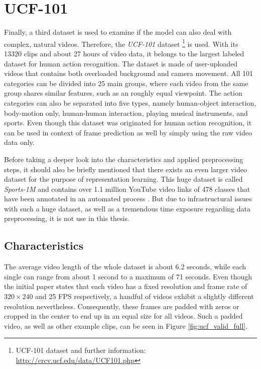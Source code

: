 \section{UCF-101} \label{sec:ds_ucf}

Finally, a third dataset is used to examine if the model can also deal with complex, natural videos. Therefore, the \textit{UCF-101} dataset \parencite{ucf}\footnote{UCF-101 dataset and further information: \url{http://crcv.ucf.edu/data/UCF101.php}} is used. With its \num{13320} clips and about \num{27} hours of video data, it belongs to the largest labeled dataset for human action recognition. The dataset is made of user-uploaded videos that contains both overloaded background and camera movement. All \num{101} categories can be divided into \num{25} main groups,  where each video from the same group shares similar features, such as an roughly equal viewpoint. The action categories can also be separated into five types, namely human-object interaction, body-motion only, human-human interaction, playing musical instruments, and sports. Even though this dataset was originated for human action recognition, it can be used in context of frame prediction as well by simply using the raw video data only.

Before taking a deeper look into the characteristics and applied preprocessing steps, it should also be briefly mentioned that there exists an even larger video dataset for the purpose of representation learning. This huge dataset is called \textit{Sports-1M} and contains over \num{1.1} million YouTube video links of \num{478} classes that have been annotated in an automated process \parencite{large_video_class}. But due to infrastructural issues with such a huge dataset, as well as a tremendous time exposure regarding data preprocessing, it is not use in this thesis.


\subsection{Characteristics}

The average video length of the whole dataset is about \num{6.2} seconds, while each single can range from about \num{1} second to a maximum of \num{71} seconds. Even though the initial paper states that each video has a fixed resolution and frame rate of $ 320 \times 240 $ and \num{25} FPS respectively, a handful of videos exhibit a slightly different resolution nevertheless. Consequently, these frames are padded with zeros or cropped in the center to end up in an equal size for all videos. Such a padded video, as well as other example clips, can be seen in Figure \ref{fig:ucf_valid_full}.

